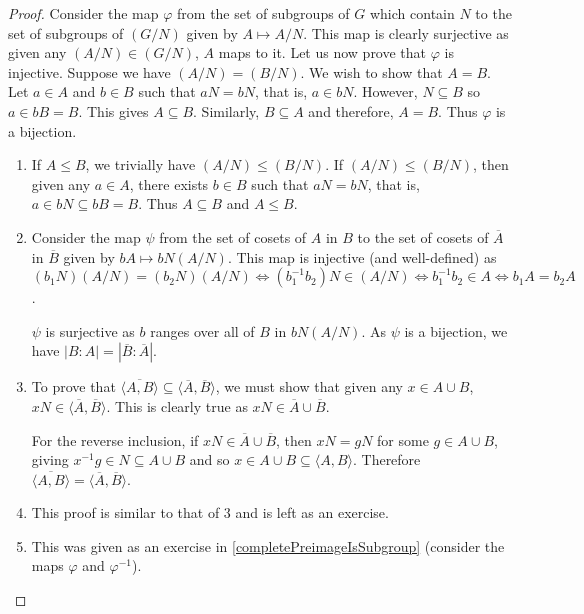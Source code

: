 \begin{proof}
    Consider the map $\varphi$ from the set of subgroups of $G$ which contain $N$ to the set of subgroups of $(G/N)$ given by $A\mapsto A/N$. This map is clearly surjective as given any $(A/N)\in (G/N)$, $A$ maps to it. Let us now prove that $\varphi$ is injective. Suppose we have $(A/N)=(B/N)$. We wish to show that $A=B$. Let $a\in A$ and $b\in B$ such that $aN=bN$, that is, $a\in bN$. However, $N\subseteq B$ so $a\in bB=B$. This gives $A\subseteq B$. Similarly, $B\subseteq A$ and therefore, $A=B$. Thus $\varphi$ is a bijection.
    \begin{enumerate}
        \item If $A\leq B$, we trivially have $(A/N)\leq(B/N)$. If $(A/N)\leq(B/N)$, then given any $a\in A$, there exists $b\in B$ such that $aN=bN$, that is, $a\in bN\subseteq bB=B$. Thus $A\subseteq B$ and $A\leq B$.
        
        \item Consider the map $\psi$ from the set of cosets of $A$ in $B$ to the set of cosets of $\overline{A}$ in $\overline{B}$ given by $bA\mapsto bN(A/N)$. This map is injective (and well-defined) as $(b_1N)(A/N)=(b_2N)(A/N)\iff (b_1^{-1}b_2)N\in (A/N)\iff b_1^{-1}b_2\in A\iff b_1A=b_2A$.
        
        $\psi$ is surjective as $b$ ranges over all of $B$ in $bN(A/N)$. As $\psi$ is a bijection, we have $|B:A|=|\overline{B}:\overline{A}|$.
        
        \item To prove that $\overline{\langle A,B\rangle}\subseteq \langle\overline{A},\overline{B}\rangle$, we must show that given any $x\in A\cup B$, $xN\in \langle\overline{A},\overline{B}\rangle$. This is clearly true as $xN\in \overline{A}\cup\overline{B}$.
        
        For the reverse inclusion, if $xN\in \overline{A}\cup\overline{B}$, then $xN=gN$ for some $g\in A\cup B$, giving $x^{-1}g\in N\subseteq A\cup B$ and so $x\in A\cup B\subseteq\langle A,B\rangle$. Therefore $\overline{\langle A,B\rangle}=\langle\overline A,\overline B\rangle$.
        
        \item This proof is similar to that of $3$ and is left as an exercise.
        
        \item This was given as an exercise in \ref{completePreimageIsSubgroup} (consider the maps $\varphi$ and $\varphi^{-1}$).
        
    \end{enumerate}
\end{proof}

